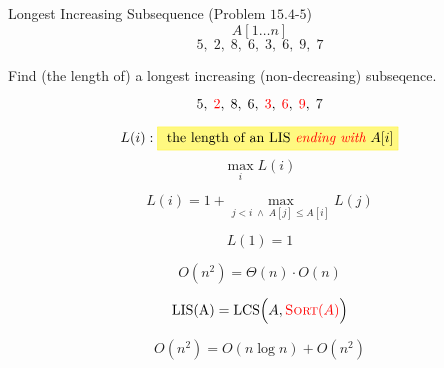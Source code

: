 
\begin{frame}{}
  \begin{exampleblock}{Longest Increasing Subsequence (Problem $15.4$-$5$)}
    \[
      A[1 \ldots n] 
    \]
    \[
      5,\; 2,\; 8,\; 6,\; 3,\; 6,\; 9,\; 7 
    \]

    \vspace{0.20cm}
    \begin{center}
      Find (the length of) a longest increasing (non-decreasing) subseqence.
    \end{center}
    \[
      5,\; \textcolor{red}{2},\; 8,\; 6,\; \textcolor{red}{3},\; \textcolor{red}{6},\; \textcolor{red}{9},\; 7 
    \]
  \end{exampleblock}
\end{frame}

% 
% 
% 

\begin{frame}{}
  \[
    L(i): \hl{yellow}{\text{ the length of an LIS \red{\it ending with} $A[i]$}}
  \]
  \[
    \max\limits_{i} L(i)
  \]

  \pause
  \begin{center}
  \end{center}

  \pause
  \[
    L(i) = 1 + \max_{j < i \;\land\; A[j] \le A[i]} L(j)
  \]

  \pause
  \[
    L(1) = 1
  \]

  \pause
  \[
    O(n^2) = \Theta(n) \cdot O(n)
  \]
\end{frame}

\begin{frame}{}
  \[
    \text{LIS(A)} = \text{LCS} \Big(A, \textcolor{red}{\textsc{Sort}(A)} \Big)
  \]

  \pause
  \[
    O(n^2) = O(n \log n) + O(n^2)
  \]
\end{frame}

